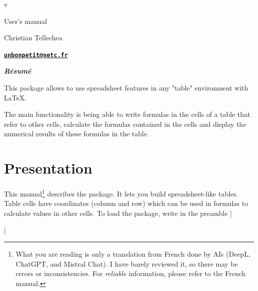 \documentclass[english,a4paper,10pt]{article}
\makeatletter
\def\engdate{\expandafter\engdatei\STdate\@nil}
\def\engdatei#1/#2/#3\@nil{\number#3\relax\space\ifcase #2 \or January\or February\or March\or April\or May\or June\or July\or August\or September\or October\or November\or December\fi{} #1}
\newcommand*\ST{\textsf{\STname}\xspace}
\makeatother
\begin{document}
\parindent0pt 
\pagestyle{fancy}
\begin{titlepage}
	\null\par\vfill
	\begin{center}
		\begin{minipage}{0.75\linewidth}
			\begin{center}
				\Huge\bfseries\ST\par\vspace{5pt}
				\small v\STver\par\vspace{35pt}
				\normalsize User's manual
			\end{center}
		\end{minipage}
	\end{center}
	\vspace{1cm}
	\begin{center}
		Christian {\sc Tellechea}\par\small
		\href{mailto:unbonpetit@netc.fr}{\texttt{\textbf{unbonpetit@netc.fr}}}\par\vspace{5pt}
		\engdate
	\end{center}
	\vfill
	\begin{center}
		\begin{minipage}{0.8\linewidth}
			\noindent\hrulefill\par
			\hfill\textbf{\textit{Résumé}}\hfill{}\medskip\par\footnotesize
				This package allows to use spreadsheet features in any "table" environment with \LaTeX{}.\par\smallskip
				The main functionality is being able to write formulas in the cells of a table that refer to other cells, calculate the formulas contained in the cells and display the numerical results of these formulas in the table.\par
			\hrulefill
		\end{minipage}
	\end{center}
	\vfill{}
\end{titlepage}

\tableofcontents\newpage
\parskip\medskipamount
\section{Presentation}
This manual\footnote{What you are reading is only a translation from French done by AIs (DeepL, ChatGPT, and Mistral Chat). I have barely reviewed it, so there may be errors or inconsistencies. For \emph{reliable} information, please refer to the French manual.} describes the \ST package. It lets you build spreadsheet-like tables. Table cells have coordinates (column and row) which can be used in formulas to calculate values in other cells. To load the package, write in the preamble
\centerverb|\usepackage{spreadtab}|
\end{document}
